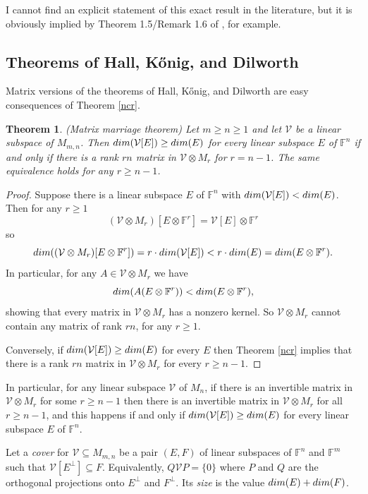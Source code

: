 \documentclass[10pt,a4paper]{amsart}
\newtheorem{thm}{Theorem}[section]
\begin{document}
I cannot find an explicit statement of this exact result in the literature, but it is obviously implied by Theorem 1.5/Remark 1.6 of \cite{IQS}, for example.

\subsection{Theorems of Hall,  Kőnig, and Dilworth}

Matrix versions of the theorems of Hall, Kőnig, and Dilworth are easy consequences of Theorem \ref{ncr}.

\begin{thm} (Matrix marriage theorem)
Let $m \geq n \geq 1$ and let $\mathcal{V}$ be a linear subspace of $M_{m,n}$. Then ${\rm dim}(\mathcal{V}[E]) \geq {\rm dim}(E)$ for every linear subspace $E$ of $\mathbb{F}^n$ if and only if there is a rank $rn$ matrix in $\mathcal{V} \otimes M_r$ for $r = n-1$. The same equivalence holds for any $r \geq n - 1$.
\end{thm}

\begin{proof}
Suppose there is a linear subspace $E$ of $\mathbb{F}^n$ with ${\rm dim}(\mathcal{V}[E]) < {\rm dim}(E)$. Then for any $r \geq 1$ $$(\mathcal{V}\otimes M_r)[E\otimes \mathbb{F}^r] = \mathcal{V}[E]\otimes \mathbb{F}^r$$ so $${\rm dim}((\mathcal{V}\otimes M_r)[E\otimes \mathbb{F}^r]) = r\cdot {\rm dim}(\mathcal{V}[E]) < r\cdot {\rm dim}(E) = {\rm dim}(E\otimes \mathbb{F}^r).$$ In particular, for any $A \in \mathcal{V}\otimes M_r$ we have $${\rm dim}(A(E\otimes \mathbb{F}^r)) < {\rm dim}(E\otimes \mathbb{F}^r),$$ showing that every matrix in $\mathcal{V}\otimes M_r$ has a nonzero kernel. So $\mathcal{V}\otimes M_r$ cannot contain any matrix of rank $rn$, for any $r \geq 1$.

Conversely, if ${\rm dim}(\mathcal{V}[E]) \geq {\rm dim}(E)$ for every $E$ then Theorem \ref{ncr} implies that there is a rank $rn$ matrix in $\mathcal{V}\otimes M_r$ for every $r \geq n-1$.
\end{proof}

In particular, for any linear subspace $\mathcal{V}$ of $M_n$, if there is an invertible matrix in $\mathcal{V}\otimes M_r$ for some $r \geq n - 1$ then there is an invertible matrix in $\mathcal{V}\otimes M_r$ for all $r \geq n - 1$, and this happens if and only if ${\rm dim}(\mathcal{V}[E]) \geq {\rm dim}(E)$ for every linear subspace $E$ of $\mathbb{F}^n$.

Let a {\it cover} for $\mathcal{V} \subseteq M_{m,n}$ be a pair $(E,F)$ of linear subspaces of $\mathbb{F}^n$ and $\mathbb{F}^m$ such that $\mathcal{V}[E^\perp] \subseteq F$. Equivalently, $Q\mathcal{V}P = \{0\}$ where $P$ and $Q$ are the orthogonal projections onto $E^\perp$ and $F^\perp$. Its {\it size} is the value ${\rm dim}(E) + {\rm dim}(F)$.
\end{document}
